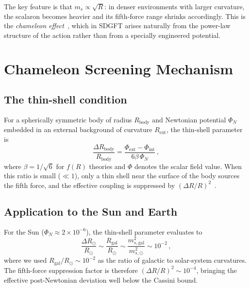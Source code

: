 \documentclass[amsmath,amssymb,aps,prd,twocolumn,superscriptaddress,nofootinbib]{revtex4-2}
\begin{document}
The key feature is that $m_s \propto \sqrt{R}$: in denser
environments with larger curvature, the scalaron becomes heavier
and its fifth-force range shrinks accordingly.  This is the
{\it chameleon effect}~\cite{Khoury2004a,Khoury2004b}, which in
SDGFT arises naturally from the power-law structure of the action
rather than from a specially engineered potential.

\section{Chameleon Screening Mechanism}
\label{sec:chameleon}

\subsection{The thin-shell condition}

For a spherically symmetric body of radius $R_{\mathrm{body}}$ and
Newtonian potential $\Phi_N$ embedded in an external background of
curvature $R_{\mathrm{ext}}$, the thin-shell parameter
is~\cite{Khoury2004a}
\begin{equation}
  \frac{\Delta R_{\mathrm{body}}}{R_{\mathrm{body}}}
    = \frac{\Phi_{\mathrm{ext}} - \Phi_{\mathrm{int}}}
           {6\beta\,\Phi_N}\,,
  \label{eq:thin_shell}
\end{equation}
where $\beta = 1/\sqrt{6}$ for $f(R)$ theories and $\Phi$ denotes
the scalar field value.  When this ratio is small ($\ll 1$), only
a thin shell near the surface of the body sources the fifth force,
and the effective coupling is suppressed by
$(\Delta R/R)^2$~\cite{Khoury2004b}.

\subsection{Application to the Sun and Earth}

For the Sun ($\Phi_N \approx 2 \times 10^{-6}$), the thin-shell
parameter evaluates to
\begin{equation}
  \frac{\Delta R_\odot}{R_\odot}
    \sim \frac{R_{\mathrm{gal}}}{R_\odot}
    \sim \frac{m_{s,\mathrm{gal}}^2}{m_{s,\odot}^2}
    \sim 10^{-2}\,,
  \label{eq:thin_shell_sun}
\end{equation}
where we used $R_{\mathrm{gal}}/R_\odot \sim 10^{-2}$ as
the ratio of galactic to solar-system curvatures.  The fifth-force
suppression factor is therefore $(\Delta R/R)^2 \sim 10^{-4}$,
bringing the effective post-Newtonian deviation well below the
Cassini bound.
\end{document}
